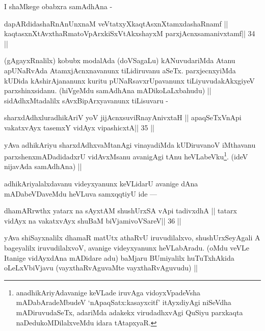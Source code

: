 \begin{artha}
I shaMkege obabxra samAdhAna -
\end{artha}

\begin{shl}
dapARdidashaRnAnUnxnaM veVtatxyXkaqtAsxnXtamxdashaRnamf ||
kaqtasxnXtAvxthaRmatoV\s pArxkiSxVtAkxshayxM parxjAcnxsamanivxtamf\hfill || 34 ||
\end{shl}

\begin{artha}
(gAgayxRnalilx) kobubx modalAda (doVSagaLu) kANuvudariMda Atanu apUNaRvAda AtamxjAcnxnavanunx tiLidiruvanu aSeTx. parxjecnxyiMda kUDida kAshirAjananunx kuritu pUNaRsavxrUpavanunx tiLiyuvudakAkxgiyeV parxshinxsidanu. (hiVgeMdu samAdhAna mADikoLaLxbahudu) || sidAdhxMtadalilx sAvxBipArxyavanunx tiLisuvaru -
\end{artha}

\begin{shl}
sharxdAdhxluradhikAriV yoV jijAcnxsuviRnayAnivxtaH ||
apaqSeTxVnApi vakatxvAyx tasemxY vidAyx vipashicxtA\hfill || 35 ||
\end{shl}

\begin{artha}
yAva adhikAriyu sharxdAdhxvaMtanAgi vinayadiMda kUDiruvanoV iMthavanu 
parxshenxmADadidadxrU vidAvxMsanu avanigAgi tAnu heVLabeVku\footnote[5]{anadhikAriyAdavanige keVLade iruvAga vidoyxVpadeVsha mADabAradeMbudeV `nApaqSatx:kasayxcitf' itAyxdiyAgi niSeVdha mADiruvudaSeTx, adariMda adakekx virudadhxvAgi QuSiyu parxkaqta naDedukoMDilalxveMdu idara tAtapxyaR.}. (ideV nijavAda samAdhAna) ||
\end{artha}

\begin{artha}
adhikAriyalalxdavanu videyxyanunx keVLidarU avanige dAna mADabeVDaveMdu heVLuva samxqqtiyU ide ---
\end{artha}

\begin{shl}
dhamARrwthx yatarx na sAyxtAM shushUrxSA vA\s pi tadivxdhA ||
tatarx vidAyx na vakatxvAyx shuBaM biVjamivoVSareV\hfill || 36 ||
\end{shl}

\begin{artha}
yAva shiSayxnalilx dhamaR matUtx athaRvU iruvudilalxvo, shushUrxSeyAgali A bageyalilx iruvudilalxvoV, avanige videyxyanunx heVLabAradu. (oMdu veVLe Itanige vidAyxdAna mADidare adu) baMjaru BUmiyalilx huTuTxhAkida oLeLxVbiVjavu (vayxthaRvAguvaMte vayxthaRvAguvudu) ||
\end{artha} 
 
